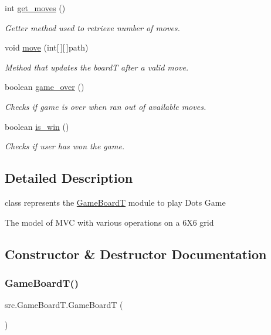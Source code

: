 \begin{DoxyCompactItemize}
int \hyperlink{classsrc_1_1GameBoardT_a75882ae5dee750812077cfd8d4ca2f93}{get\+\_\+moves} ()
\begin{DoxyCompactList}\small\item\em Getter method used to retrieve number of moves. \end{DoxyCompactList}\item 
void \hyperlink{classsrc_1_1GameBoardT_a77afa90110ea1b3ba85054f0944b74fb}{move} (int\mbox{[}$\,$\mbox{]}\mbox{[}$\,$\mbox{]}path)
\begin{DoxyCompactList}\small\item\em Method that updates the boardT after a valid move. \end{DoxyCompactList}\item 
boolean \hyperlink{classsrc_1_1GameBoardT_aae78025d300e5ea77bf417e02f83156f}{game\+\_\+over} ()
\begin{DoxyCompactList}\small\item\em Checks if game is over when ran out of available moves. \end{DoxyCompactList}\item 
boolean \hyperlink{classsrc_1_1GameBoardT_aa1221629c1ad21ce5931718b599bbabb}{is\+\_\+win} ()
\begin{DoxyCompactList}\small\item\em Checks if user has won the game. \end{DoxyCompactList}\end{DoxyCompactItemize}


\subsection{Detailed Description}
class represents the \hyperlink{classsrc_1_1GameBoardT}{Game\+BoardT} module to play Dots Game 

The model of M\+VC with various operations on a 6\+X6 grid 

\subsection{Constructor \& Destructor Documentation}
\mbox{\label{classsrc_1_1GameBoardT_a0bff613b5cb6df8ff1b47f24fc0854d0}} 
\subsubsection{\texorpdfstring{Game\+Board\+T()}{GameBoardT()}}
{\footnotesize\ttfamily src.\+Game\+Board\+T.\+Game\+BoardT (\begin{DoxyParamCaption}{ }\end{DoxyParamCaption})}



